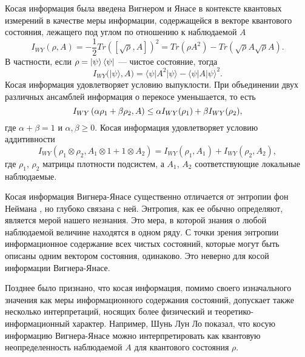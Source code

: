 Косая информация\cite{Wigner1963} была введена Вигнером и Янасе
в контексте квантовых измерений в качестве меры информации,
содержащейся в векторе квантового состояния, лежащего под углом по отношению к наблюдаемой $A$
%
\begin{equation}\label{eq:wyi}
  I_{WY}(\rho, A)
  = -\frac{1}{2} Tr([\sqrt{\rho}, A])^2
  = Tr(\rho A^2) - Tr(\sqrt \rho A \sqrt \rho  A ).
\end{equation}
%
В частности, если $\rho = \left| \psi \right\rangle\left\langle \psi \right|$ --- чистое состояние, тогда
%
\begin{equation}\label{eq:wyi-pure}
  I_{WY}(| \psi \rangle, A)
  = \langle \psi | A^2 | \psi \rangle - \langle \psi | A| \psi \rangle ^2.
\end{equation}
Косая информация удовлетворяет условию выпуклости.
При объединении двух различных ансамблей информация о перекосе уменьшается, то есть
%
\begin{equation}\label{eq:wyi-convex}
  I_{WY}\left( \alpha \rho_1 + \beta \rho_2, A \right)
  \leq \alpha I_{WY}(\rho_1) + \beta I_{WY}(\rho_2),
\end{equation}
где $\alpha + \beta = 1$ и $\alpha, \beta \geq 0$.
%
Косая информация удовлетворяет условию аддитивности
%
\begin{equation}\label{eq:wyi-additivity}
 I_{WY}(\rho_1 \otimes \rho_2, A_1 \otimes 1 + 1 \otimes A_2)
 = I_{WY}(\rho_1, A_1) + I_{WY}(\rho_2, A_2),
\end{equation}
%
где $\rho_1$, $\rho_2$ матрицы плотности подсистем,
а $A_1$, $A_2$ соответствующие локальные наблюдаемые.
%

Косая информация Вигнера-Янасе существенно отличается от энтропии фон Неймана \cite{Wigner1952, Araki1960, Lieb1973prl, Lieb1973, Wehrl1978},
но глубоко связана с ней.
Энтропия, как ее обычно определяют, является мерой нашего незнания\cite{Weaver1949}.
Это мера, в которой знания о любой наблюдаемой величине находятся в одном ряду.
С точки зрения энтропии информационное содержание всех чистых состояний,
которые могут быть описаны одним вектором состояния, одинаково.
Это неверно для косой информации Вигнера-Янасе.

Позднее было признано, что косая информация,
помимо своего изначального значения как меры информационного содержания состояний,
допускает также несколько интерпретаций,
носящих более физический и теоретико-информационный характер.
Например, Шунь Лун Ло показал\cite{Luo2003prl, Luo2005, Luo2005pra, Luo2006, Luo2017},
что косую информацию Вигнера-Янасе можно интерпретировать
как квантовую неопределенность наблюдаемой $A$ для квантового состояния $\rho$.

